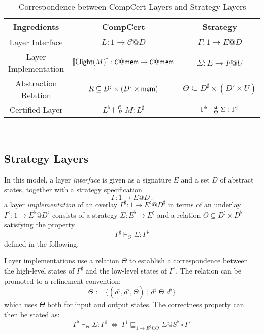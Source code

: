 \documentclass[acmsmall,review,anonymous]{acmart}\settopmatter{printfolios=true,printccs=false,printacmref=false}
\begin{document}
\begin{table}
  \centering
  \begin{tabular}{ccc}
    \toprule
    Ingredients
    & CompCert
    & Strategy \\
    \midrule
    Layer Interface
    & $L: 1 \rightarrow \mathcal{C}@D$
    & $\Gamma: 1 \rightarrow E@D$\\
    Layer Implementation
    & $\llbracket  \mathsf{Clight} (M) \rrbracket
      : \mathcal{C}@ \mathsf{mem}  \rightarrow \mathcal{C}@ \mathsf{mem} $
    & $\Sigma : E \rightarrow F@U$\\
    Abstraction Relation
    & $R \subseteq D^\sharp \times (D^\flat \times  \mathsf{mem} )$
    & $\Theta \subseteq D^\sharp \times (D^\flat \times U)$\\
    Certified Layer
    & $L^\flat \vdash^\mathcal{C}_R M : L^\sharp$
    & $\Gamma^\flat \vdash^{ \mathsf{st} }_\Theta \Sigma : \Gamma^\sharp$\\
    \bottomrule
  \end{tabular}
  \\
  \caption{Correspondence between CompCert Layers and Strategy Layers}
  \label{tab:correspondence}
\end{table}

\subsection{Strategy Layers} %
\label{sec:stcal:layer}

In this model,
a layer \emph{interface} is given as
a signature $E$ and
a set $D$ of abstract states,
together with a strategy specification
\[ \Gamma : 1 \rightarrow E@D \,. \]
a layer \emph{implementation}
of an overlay $\Gamma^\sharp : 1 \rightarrow E^\sharp@D^\sharp$
in terms of an underlay
$\Gamma^\flat : 1 \rightarrow E^\flat@D^\flat$
consists of
a strategy $\Sigma : E^\flat \rightarrow E^\sharp$ and
a relation $\Theta \subseteq D^\sharp \times D^\flat$
satisfying the property
\[ \Gamma^\sharp \vdash_\Theta \Sigma : \Gamma^\flat \]
defined in the following.

Layer implementations use a relation $\Theta$
to establish a correspondence between
the high-level states of $\Gamma^\sharp$ and
the low-level states of $\Gamma^\flat$.
The relation can be promoted to a refinement convention:
\[
  \hat{\Theta} := \{ (d^\sharp, d^\flat, \Theta) \mid d^\sharp \mathrel{\Theta} d^\flat \}
\]
which uses $\Theta$ both for
input and output states.
The correctness property can then be stated as:
\[
  \Gamma^\flat \vdash_\Theta \Sigma : \Gamma^\sharp \:\Leftrightarrow\:
  \Gamma^\sharp \sqsubseteq_{1 \rightarrow E^\sharp@\hat{\Theta}} \Sigma@S^\flat \circ \Gamma^\flat
\]
\end{document}
